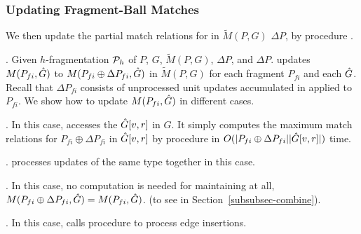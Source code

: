 \vspace{-.5ex}


\subsubsection{Updating Fragment-Ball Matches}
\label{subsubsec-updtm}

We then update the partial match relations for \affballsx in $\tilde{M}(P,G)$ \wrt $\Delta P$,
by procedure \incmatch.


. Given $h$-fragmentation ${\cal P}_{h}$ of $P$, $G$, $\tilde{M}(P,G)$, $\Delta P$, \upl and \affballsx \wrt $\Delta P$.
\incmatch updates $M(P_{fi}, \hat{G}{})$ to $M(P_{fi}\oplus\Delta P_{fi}, \hat{G}{})$ in $\tilde{M}(P,G)$ for each fragment $P_{fi}$ and each \affballx $\hat{G}{}$.
Recall that $\Delta P_{fi}$ consists of unprocessed unit updates accumulated in \upl applied to $P_{fi}$.
We show how to update $M(P_{fi}, \hat{G}{})$ in different cases.




.
In this case, \incmatch accesses the \affballx $\hat{G}{[v,r]}$ in $G$.
It simply computes the maximum match relations for $P_{fi}\oplus \Delta P_{fi}$ in $\hat{G}{[v,r]}$
by procedure \rgraphsim in $O(|P_{fi}\oplus \Delta P_{fi}||\hat{G}{[v,r]}|)$ time.

.
\incmatch processes updates of the same type together in this case.

.
In this case, no computation is needed for maintaining  \affballsx at all,
\ie $M(P_{fi}\oplus\Delta P_{fi}, \hat{G}{}) = M(P_{fi}, \hat{G}{})$.
 (to see in Section~\ref{subsubsec-combine}).




.
In this case, \incmatch calls procedure \patedgeinsert to process edge insertions.



